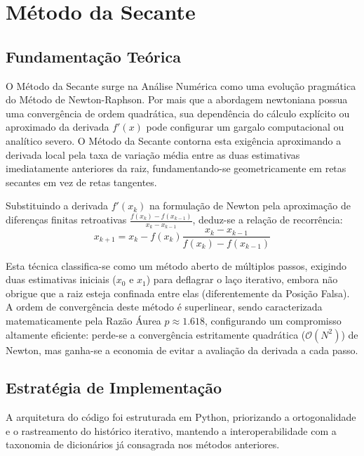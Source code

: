 \section{Método da Secante}
\label{sec:metodo_secante}

\subsection{Fundamentação Teórica}
\label{subsec:fundamentacao_teorica_secante}

O Método da Secante surge na Análise Numérica como uma evolução pragmática do Método de Newton-Raphson. Por mais que a abordagem newtoniana possua uma convergência de ordem quadrática, sua dependência do cálculo explícito ou aproximado da derivada $f'(x)$ pode configurar um gargalo computacional ou analítico severo. O Método da Secante contorna esta exigência aproximando a derivada local pela taxa de variação média entre as duas estimativas imediatamente anteriores da raiz, fundamentando-se geometricamente em retas secantes em vez de retas tangentes.

Substituindo a derivada $f'(x_k)$ na formulação de Newton pela aproximação de diferenças finitas retroativas $\frac{f(x_k) - f(x_{k-1})}{x_k - x_{k-1}}$, deduz-se a relação de recorrência:
\begin{equation}
    x_{k+1} = x_k - f(x_k) \frac{x_k - x_{k-1}}{f(x_k) - f(x_{k-1})}
    \label{eq:formulacao_secante}
\end{equation}

Esta técnica classifica-se como um método aberto de múltiplos passos, exigindo duas estimativas iniciais ($x_0$ e $x_1$) para deflagrar o laço iterativo, embora não obrigue que a raiz esteja confinada entre elas (diferentemente da Posição Falsa). A ordem de convergência deste método é superlinear, sendo caracterizada matematicamente pela Razão Áurea $p \approx 1.618$, configurando um compromisso altamente eficiente: perde-se a convergência estritamente quadrática ($\mathcal{O}(N^2)$) de Newton, mas ganha-se a economia de evitar a avaliação da derivada a cada passo.

\subsection{Estratégia de Implementação}
\label{subsec:estrategia_implementacao_secante}

A arquitetura do código foi estruturada em Python, priorizando a ortogonalidade e o rastreamento do histórico iterativo, mantendo a interoperabilidade com a taxonomia de dicionários já consagrada nos métodos anteriores.

